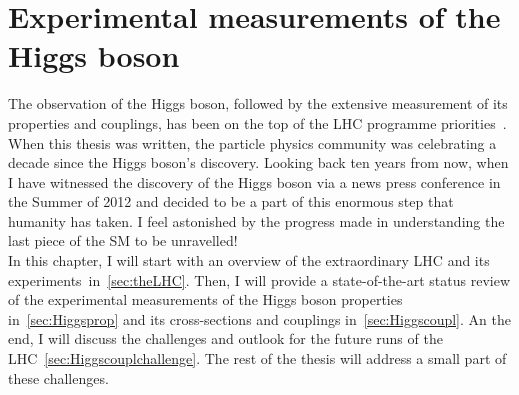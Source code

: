 \chapter{Experimental measurements of the Higgs boson }\label{chap:HiggsConstr}
The observation of the Higgs boson, followed by the extensive measurement of its properties and couplings, has been on the top of the LHC programme priorities~\cite{ellis2000physics}. When this thesis was written, the particle physics community was celebrating a decade since the Higgs boson's discovery. Looking back ten years from now, when I have witnessed the discovery of the Higgs boson via a news press conference in the Summer of 2012 and decided to be a part of this enormous step that humanity has taken.
I feel astonished by the progress made in understanding the last piece of the SM to be unravelled!  \\ In this chapter, I will start with an overview of the extraordinary LHC and its experiments~in~\autoref{sec:theLHC}. Then, I will provide a state-of-the-art status review of the experimental measurements of the Higgs boson properties in~\autoref{sec:Higgsprop} and its cross-sections and couplings in~\autoref{sec:Higgscoupl}. An the end, I will discuss the challenges and outlook for the future runs of the LHC~\autoref{sec:Higgscouplchallenge}. The rest of the thesis will address a small part of these challenges.
